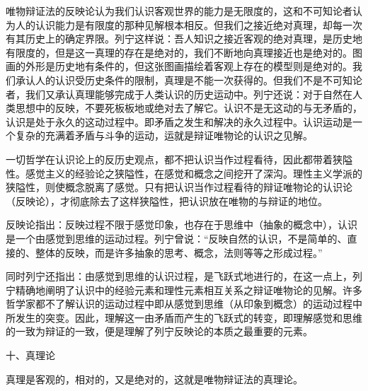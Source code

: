 唯物辩证法的反映论认为我们认识客观世界的能力是无限度的，这和不可知论者认为人的认识能力是有限度的那种见解根本相反。但我们之接近绝对真理，却每一次有其历史上的确定界限。列宁这样说：吾人知识之接近客观的绝对真理，是历史地有限度的，但是这一真理的存在是绝对的，我们不断地向真理接近也是绝对的。图画的外形是历史地有条件的，但这张图画描绘着客观上存在的模型则是绝对的。我们承认人的认识受历史条件的限制，真理是不能一次获得的。但我们不是不可知论者，我们又承认真理能够完成于人类认识的历史运动中。列宁还说：对于自然在人类思想中的反映，不要死板板地或绝对去了解它。认识不是无这动的与无矛盾的，认识是处于永久的这动过程中。即矛盾之发生和解决的永久过程中。认识运动是一个复杂的充满着矛盾与斗争的运动，运就是辩证唯物论的认识之见解。

一切哲学在认识论上的反历史观点，都不把认识当作过程看待，因此都带着狭隘性。感觉主义的经验论之狭隘性，在感觉和概念之间挖开了深沟。理性主义学派的狭隘性，则使概念脱离了感觉。只有把认识当作过程看待的辩证唯物论的认识论（反映论），才彻底除去了这样狭隘性，把认识放在唯物的与辩证的地位。

反映论指出：反映过程不限于感觉印象，也存在于思维中（抽象的概念中），认识是一个由感觉到思维的运动过程。列宁曾说：“反映自然的认识，不是简单的、直接的、整体的反映，而是许多抽象的思考、概念，法则等等之形成过程。”

同时列宁还指出：由感觉到思维的认识过程，是飞跃式地进行的，在这一点上，列宁精确地阐明了认识中的经验元素和理性元素相互关系之辩证唯物论的见解。许多哲学家都不了解认识的运动过程中即从感觉到思维（从印象到概念）的运动过程中所发生的突变。因此，理解这一由矛盾而产生的飞跃式的转变，即理解感觉和思维的一致为辩证的一致，便是理解了列宁反映论的本质之最重要的元素。

十、真理论

真理是客观的，相对的，又是绝对的，这就是唯物辩证法的真理论。

